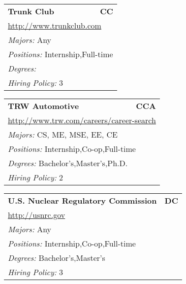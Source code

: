 \documentclass[twoside]{article}
\begin{document}
\begin{center}
\begin{multicols}{3}
\begin{FlushLeft}
\begin{minipage}{.9\columnwidth}
\end{minipage}
 
\begin{minipage}{.9\columnwidth}\begin{tabularx}{.95\columnwidth}{Xr}
                 {\Large\bf Trunk Club} & {\Large\bf CC}\\
    \multicolumn{2}{p{.95\columnwidth}}{\url{http://www.trunkclub.com}}\\
    \multicolumn{2}{p{.95\columnwidth}}{\emph{Majors:} Any}\\
    \multicolumn{2}{p{.95\columnwidth}}{\emph{Positions:} Internship,Full-time}\\
    \multicolumn{2}{p{.95\columnwidth}}{\emph{Degrees:} }\\
    \multicolumn{2}{p{.95\columnwidth}}{\emph{Hiring Policy:} 3}\\
    \end{tabularx}
    
\end{minipage}
 
\begin{minipage}{.9\columnwidth}\begin{tabularx}{.95\columnwidth}{Xr}
                 {\Large\bf TRW Automotive} & {\Large\bf CCA}\\
    \multicolumn{2}{p{.95\columnwidth}}{\url{http://www.trw.com/careers/career-search}}\\
    \multicolumn{2}{p{.95\columnwidth}}{\emph{Majors:} CS, ME, MSE, EE, CE}\\
    \multicolumn{2}{p{.95\columnwidth}}{\emph{Positions:} Internship,Co-op,Full-time}\\
    \multicolumn{2}{p{.95\columnwidth}}{\emph{Degrees:} Bachelor's,Master's,Ph.D.}\\
    \multicolumn{2}{p{.95\columnwidth}}{\emph{Hiring Policy:} 2}\\
    \end{tabularx}
    
\end{minipage}
 
\begin{minipage}{.9\columnwidth}\begin{tabularx}{.95\columnwidth}{Xr}
                 {\Large\bf U.S. Nuclear Regulatory Commission} & {\Large\bf DC}\\
    \multicolumn{2}{p{.95\columnwidth}}{\url{http://usnrc.gov}}\\
    \multicolumn{2}{p{.95\columnwidth}}{\emph{Majors:} Any}\\
    \multicolumn{2}{p{.95\columnwidth}}{\emph{Positions:} Internship,Co-op,Full-time}\\
    \multicolumn{2}{p{.95\columnwidth}}{\emph{Degrees:} Bachelor's,Master's}\\
    \multicolumn{2}{p{.95\columnwidth}}{\emph{Hiring Policy:} 3}\\
    \end{tabularx}
    

\end{minipage}
\end{FlushLeft}
\end{multicols}
\end{center}
\end{document}
